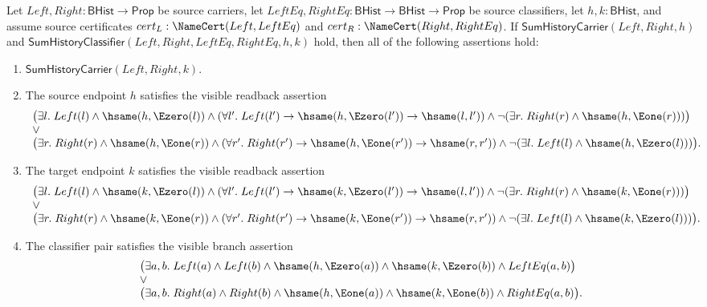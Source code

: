 \begin{theorem}
\label{thm:sum-history-classifier-source-certified-endpoint-readback}
Let $Left,Right:\mathsf{BHist}\to\mathsf{Prop}$ be source carriers, let
$LeftEq,RightEq:\mathsf{BHist}\to\mathsf{BHist}\to\mathsf{Prop}$ be source
classifiers, let $h,k:\mathsf{BHist}$, and assume source certificates
$cert_L:\NameCert(Left,LeftEq)$ and $cert_R:\NameCert(Right,RightEq)$. If
$\mathsf{SumHistoryCarrier}(Left,Right,h)$ and
$\mathsf{SumHistoryClassifier}(Left,Right,LeftEq,RightEq,h,k)$ hold, then all
of the following assertions hold:
\begin{enumerate}
  \item $\mathsf{SumHistoryCarrier}(Left,Right,k)$.
  \item The source endpoint $h$ satisfies the visible readback assertion
  $$
  \begin{array}{l}
  \bigl(\exists l.\; Left(l)\land \hsame(h,\Ezero(l))\land
  (\forall l'.\; Left(l')\to \hsame(h,\Ezero(l'))\to \hsame(l,l'))\land
  \neg(\exists r.\; Right(r)\land \hsame(h,\Eone(r)))\bigr)\\
  \lor\\
  \bigl(\exists r.\; Right(r)\land \hsame(h,\Eone(r))\land
  (\forall r'.\; Right(r')\to \hsame(h,\Eone(r'))\to \hsame(r,r'))\land
  \neg(\exists l.\; Left(l)\land \hsame(h,\Ezero(l)))\bigr).
  \end{array}
  $$
  \item The target endpoint $k$ satisfies the visible readback assertion
  $$
  \begin{array}{l}
  \bigl(\exists l.\; Left(l)\land \hsame(k,\Ezero(l))\land
  (\forall l'.\; Left(l')\to \hsame(k,\Ezero(l'))\to \hsame(l,l'))\land
  \neg(\exists r.\; Right(r)\land \hsame(k,\Eone(r)))\bigr)\\
  \lor\\
  \bigl(\exists r.\; Right(r)\land \hsame(k,\Eone(r))\land
  (\forall r'.\; Right(r')\to \hsame(k,\Eone(r'))\to \hsame(r,r'))\land
  \neg(\exists l.\; Left(l)\land \hsame(k,\Ezero(l)))\bigr).
  \end{array}
  $$
  \item The classifier pair satisfies the visible branch assertion
  $$
  \begin{array}{l}
  \bigl(\exists a,b.\; Left(a)\land Left(b)\land
  \hsame(h,\Ezero(a))\land \hsame(k,\Ezero(b))\land LeftEq(a,b)\bigr)\\
  \lor\\
  \bigl(\exists a,b.\; Right(a)\land Right(b)\land
  \hsame(h,\Eone(a))\land \hsame(k,\Eone(b))\land RightEq(a,b)\bigr).
  \end{array}
  $$
\end{enumerate}
\end{theorem}
